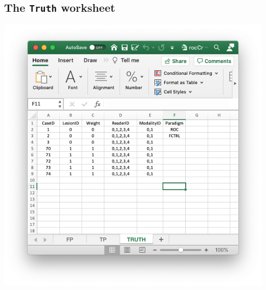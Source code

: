 \documentclass[
]{book}
\begin{document}
\hypertarget{quick-start-data-format-truth-worksheet}{%
\subsection{\texorpdfstring{The \texttt{Truth} worksheet}{The Truth worksheet}}\label{quick-start-data-format-truth-worksheet}}

\includegraphics[width=1\textwidth,height=\textheight]{images/quick-start/rocCrTruth.png}
\end{document}

